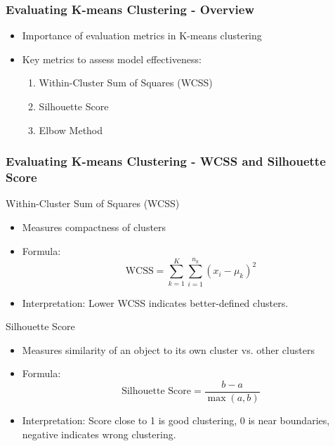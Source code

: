 \documentclass{beamer}
\begin{document}
\begin{frame}[fragile]
    \frametitle{Evaluating K-means Clustering - Overview}
    \begin{itemize}
        \item Importance of evaluation metrics in K-means clustering
        \item Key metrics to assess model effectiveness:
        \begin{enumerate}
            \item Within-Cluster Sum of Squares (WCSS)
            \item Silhouette Score
            \item Elbow Method
        \end{enumerate}
    \end{itemize}
\end{frame}

\begin{frame}[fragile]
    \frametitle{Evaluating K-means Clustering - WCSS and Silhouette Score}
    \begin{block}{Within-Cluster Sum of Squares (WCSS)}
        \begin{itemize}
            \item Measures compactness of clusters
            \item Formula: 
            \begin{equation}
                \text{WCSS} = \sum_{k=1}^{K} \sum_{i=1}^{n_k} (x_i - \mu_k)^2
            \end{equation}
            \item Interpretation: Lower WCSS indicates better-defined clusters.
        \end{itemize}
    \end{block}
    
    \begin{block}{Silhouette Score}
        \begin{itemize}
            \item Measures similarity of an object to its own cluster vs. other clusters
            \item Formula: 
            \begin{equation}
                \text{Silhouette Score} = \frac{b - a}{\max(a, b)}
            \end{equation}
        \end{itemize}
        \begin{itemize}
            \item Interpretation: Score close to 1 is good clustering, 0 is near boundaries, negative indicates wrong clustering.
        \end{itemize}
    \end{block}
\end{frame}
\end{document}
